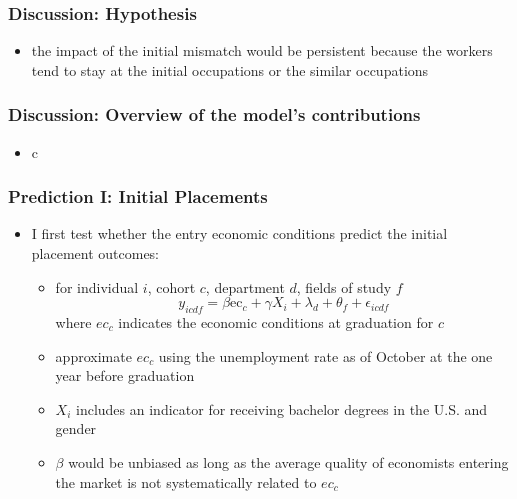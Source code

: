 \documentclass[11pt]{beamer}
\begin{document}
\begin{frame}
	\frametitle{Discussion: Hypothesis}
	\begin{itemize}
		\begin{block}<1->{Hypothesis}
			Economists' human capital is task specific, and the occupations are specialized in different ways
		\end{block}
		\item the impact of the initial mismatch would be persistent because the workers tend to stay at the initial occupations or the similar occupations 
	\end{itemize}
\end{frame}


\begin{frame}
	\frametitle{Discussion: Overview of the model's contributions}
	\begin{itemize}
		\item c
	\end{itemize}
\end{frame}





\begin{frame}
	\frametitle{Prediction I: Initial Placements}
	\begin{itemize}
		\item I first test whether the entry economic conditions predict the initial placement outcomes: 
		\begin{itemize}
			\item for individual $i$, cohort $c$, department $d$, fields of study $f$
		\begin{equation}
			\label{eq:eq1}
			y_{icdf} = \beta \text{ec}_{c}+\gamma X_{i}+\lambda_{d}+\theta_f  +\epsilon_{icdf}
		\end{equation}
	where $ec_c$ indicates the economic conditions at graduation for $c$
	\item  approximate $ec_c$  using the unemployment rate as of October at the one year before graduation
	\item $X_i$ includes an indicator for receiving bachelor degrees in the U.S. and gender
	\item  $\beta$ would be unbiased as long as the average quality of economists entering the market is not systematically related to $ec_c$
\end{itemize}
	\end{itemize}
\end{frame}
\end{document}
